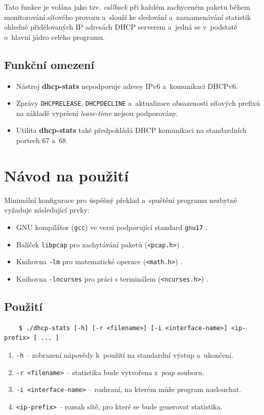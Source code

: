 \documentclass[a4paper, 11pt]{article}
\begin{document}
Tato funkce je volána jako tzv. \textit{callback} při každém zachyceném paketu během monitorování síťového provozu a~slouží ke sledování a~zaznamenávání statistik ohledně přidělovaných IP adresách DHCP serverem a~jedná se v~podstatě o~hlavní jádro celého programu.

\subsection{Funkční omezení}
\begin{itemize}
    \item Nástroj \textbf{dhcp-stats} nepodporuje adresy IPv6 a~komunikaci DHCPv6.
    \item Zprávy \texttt{DHCPRELEASE}, \texttt{DHCPDECLINE} a~aktualizace obsazenosti síťových prefixů na základě vypršení \textit{lease-time} nejsou podporovány.
    \item Utilita \textbf{dhcp-stats} také předpokládá DHCP komunikaci na standardních portech 67 a~68.
\end{itemize}

\newpage

\section{Návod na použití}
Minimální konfigurace pro úspěšný překlad a~spuštění programu nezbytně vyžaduje následující prvky:
\begin{itemize}
    \item GNU kompilátor (\texttt{gcc}) ve verzi podporující standard \texttt{gnu17} \cite{gcc}.
    \item Balíček \texttt{libpcap} pro zachytávání paketů (\texttt{<pcap.h>}) \cite{libpcap}.
    \item Knihovna \texttt{-lm} pro matematické operace (\texttt{<math.h>}) \cite{math}.
    \item Knihovna \texttt{-lncurses} pro práci s terminálem (\texttt{<ncurses.h>}) \cite{ncurses}.
\end{itemize}

\subsection{Použití}
\begin{verbatim}
    $ ./dhcp-stats [-h] [-r <filename>] [-i <interface-name>] <ip-prefix> [ ... ]
\end{verbatim}

\begin{enumerate}
    \item[] \texttt{-h} -- zobrazení nápovědy k~použití na standardní výstup a~ukončení.
    \item[] \texttt{-r <filename>} -- statistika bude vytvořena z~\textit{pcap} souboru.
    \item[] \texttt{-i <interface-name>} -- rozhraní, na kterém může program naslouchat.
    \item[] \texttt{<ip-prefix>} -- rozsah sítě, pro které se bude generovat statistika.
\end{enumerate}
\end{document}
